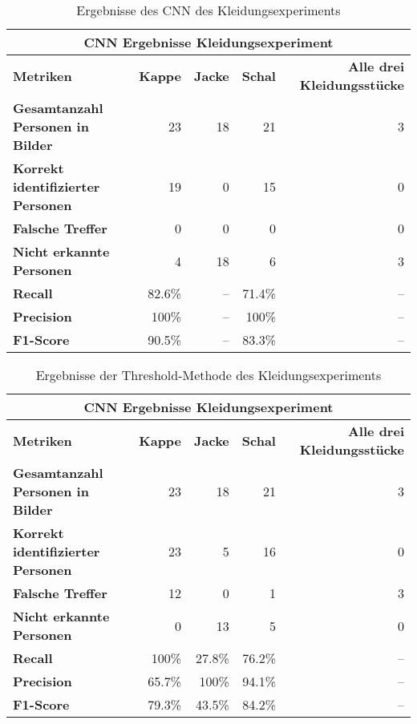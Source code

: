 {
	\renewcommand{\arraystretch}{1.3}
	\begin{table}[H]
		\centering
		\scriptsize
		\begin{tabularx}{.9\textwidth}{Xrrrr}
			\hline
			\multicolumn{5}{c}{\textbf{CNN Ergebnisse Kleidungsexperiment}}\\
			\hline
			\textbf{Metriken} & \textbf{Kappe} & \textbf{Jacke} & \textbf{Schal} & \textbf{Alle drei Kleidungsstücke}\\
			\hline 
			\textbf{Gesamtanzahl Personen in Bilder} & 23 & 18 & 21 & 3\\
			\hline
			\textbf{Korrekt identifizierter Personen} & 19 & 0 & 15 & 0\\
			\hline
			\textbf{Falsche Treffer} & 0 & 0 & 0 & 0\\
			\hline
			\textbf{Nicht erkannte Personen} & 4 & 18 & 6 & 3\\
			\hline
			\textbf{Recall} & 82.6\% & -- & 71.4\% & -- \\
			\hline  
			\textbf{Precision} & 100\% & -- & 100\% & -- \\
			\hline
			\textbf{F1-Score} & 90.5\% & -- & 83.3\% & -- \\
			\hline
		\end{tabularx}
		\caption{Ergebnisse des CNN des Kleidungsexperiments}
		\label{tbl:clothCNN}
	\end{table}
	\begin{table}[H]
		\centering
		\scriptsize
		\begin{tabularx}{.9\textwidth}{Xrrrr}
			\hline
			\multicolumn{5}{c}{\textbf{CNN Ergebnisse Kleidungsexperiment}}\\
			\hline
			\textbf{Metriken} & \textbf{Kappe} & \textbf{Jacke} & \textbf{Schal} & \textbf{Alle drei Kleidungsstücke}\\
			\hline 
			\textbf{Gesamtanzahl Personen in Bilder} & 23 & 18 & 21 & 3\\
			\hline
			\textbf{Korrekt identifizierter Personen} & 23 & 5 & 16 & 0\\
			\hline
			\textbf{Falsche Treffer} & 12 & 0 & 1 & 3\\
			\hline
			\textbf{Nicht erkannte Personen} & 0 & 13 & 5 & 0\\
			\hline
			\textbf{Recall} & 100\% & 27.8\% & 76.2\% & -- \\
			\hline  
			\textbf{Precision} & 65.7\% & 100\% & 94.1\% & -- \\
			\hline
			\textbf{F1-Score} & 79.3\% & 43.5\% & 84.2\% & -- \\
			\hline
		\end{tabularx}
		\caption{Ergebnisse der Threshold-Methode des Kleidungsexperiments}
		\label{tbl:clothThresh}
	\end{table}
}



